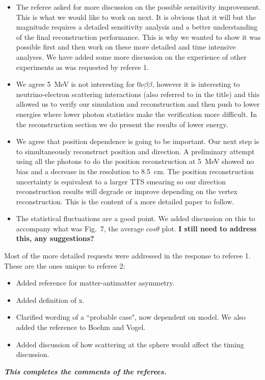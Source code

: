 \documentclass[11pt]{article}
\begin{document}
\begin{itemize}
\item The referee asked for more discussion on the possible sensitivity improvement. This is what we would like to work on next. It is obvious that it will but the magnitude requires a detailed sensitivity analysis and a better understanding of the final reconstruction performance. This is why we wanted to show it was possible first and then work on these more detailed and time intensive analyses. We have added some more discussion on the experience of other experiments as was requested by referee 1.
\item We agree 5~MeV is not interesting for $0\nu\beta\beta$, however it is interesting to neutrino-electron scattering interactions (also referred to in the title) and this allowed us to verify our simulation and reconstruction and then push to lower energies where lower photon statistics make the verification more difficult. In the reconstruction section we do present the results of lower energy.
\item  We agree that position dependence is going to be important. Our next step is to simultaneously reconstruct position and direction. A preliminary attempt  using all the photons to do the position reconstruction at 5~MeV showed no bias and a decrease in the resolution to 8.5~cm. The position reconstruction uncertainty is equivalent to a larger TTS smearing so our direction reconstruction results will degrade or improve depending on the vertex reconstruction. This is the content of a more detailed paper to follow.
\item The statistical fluctuations are a good point. We added discussion on this to accompany what was Fig.~7, the average $cos\theta$ plot.  {\bf I still need to address this, any suggestions?}
\end{itemize}

Most of the more detailed requests were addressed in the response to referee 1.  These are the ones unique to referee 2:

\begin{itemize}
\item Added reference for matter-antimatter asymmetry.
\item Added definition of x.
\item Clarified wording of a ``probable case", now dependent on model. We also added the reference to Boehm and Vogel.
\item Added discussion of how scattering at the sphere would affect the timing discussion.
\end{itemize}

{\bf \it This completes the comments of the referees.}

% 
\end{document}
